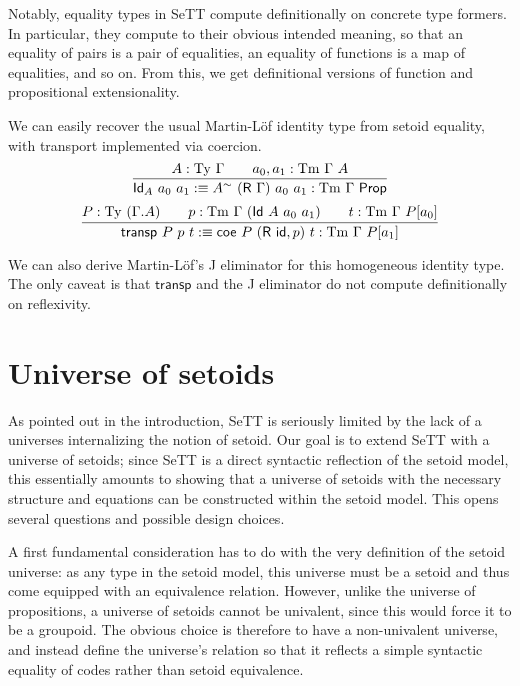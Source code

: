 \documentclass[autoref]{llncs}
\newcommand{\GG}{\Gamma}
\newcommand{\R}{\textsf{R}}
\newcommand{\Id}{\textsf{Id}}
\newcommand{\coe}{\textsf{coe}}
\newcommand{\tyj}[2]{#2 : \Ty\ #1}
\newcommand{\tmj}[3]{#2 : \Tm\ #1\ #3}
\newcommand{\Prop}{\textsf{Prop}}
\newcommand{\Ty}{\mathrm{Ty}}
\newcommand{\Tm}{\mathrm{Tm}}
\begin{document}
Notably, equality types in SeTT compute definitionally on concrete type
formers. In particular, they compute to their obvious intended meaning, so that
an equality of pairs is a pair of equalities, an equality of functions is a map
of equalities, and so on. From this, we get definitional versions of function
and propositional extensionality.

We can easily recover the usual Martin-L\"of identity type from setoid equality,
with transport implemented via coercion.
\[
\infer{
  \textsf{Id}_A\ a_0\ a_1 :\equiv A^{\sim}\ (\R\ \GG)\ a_0\ a_1 : \Tm\ \GG\ \Prop
}{
  \tyj{\GG}{A} \qquad \tmj{\GG}{a_0, a_1}{A}
}
\]
\[
\infer{
  \textsf{transp}\ P\ p\ t :\equiv
    \coe\ P\ (\textsf{R}\ \textsf{id} , p)\ t : \Tm\ \GG\ P[a_1]
}{
  P : \Ty\ (\GG . A)
  \qquad
  p : \Tm\ \GG\ (\Id\ A\ a_0\ a_1)
  \qquad
  t : \Tm\ \GG\ P[a_0]
}
\]

We can also derive Martin-L\"of's J eliminator for this homogeneous identity
type. The only caveat is that $\textsf{transp}$ and the J eliminator do not
compute definitionally on reflexivity.

\section{Universe of setoids}\label{setoid-universe}

As pointed out in the introduction, SeTT is seriously limited by the lack of a
universes internalizing the notion of setoid. Our goal is to extend SeTT with a
universe of setoids; since SeTT is a direct syntactic reflection of the setoid
model, this essentially amounts to showing that a universe of setoids with the
necessary structure and equations can be constructed within the setoid
model. This opens several questions and possible design choices.

A first fundamental consideration has to do with the very definition of the setoid
universe: as any type in the setoid model, this universe must be a setoid and
thus come equipped with an equivalence relation. However, unlike the universe of
propositions, a universe of setoids cannot be univalent, since this would force
it to be a groupoid. The obvious choice is therefore to have a non-univalent
universe, and instead define the universe's relation so that it reflects a
simple syntactic equality of codes rather than setoid equivalence.
\end{document}
